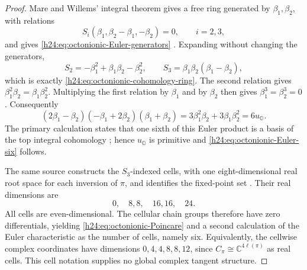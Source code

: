 \begin{proof}
Mare and Willems' integral theorem gives a free ring generated by
\(\beta_1,\beta_2\), with relations
\[
 S_i(\beta_1,\beta_2-\beta_1,-\beta_2)=0,\qquad i=2,3,
\]
and gives \eqref{h24:eq:octonionic-Euler-generators}
\cite[Theorem~1.1, p.~484, and Equation~(3.2),
p.~496]{h24:MareWillems2013}.  Expanding without changing the generators,
\[
 S_2=-\beta_1^2+\beta_1\beta_2-\beta_2^2,\qquad
 S_3=\beta_1\beta_2(\beta_1-\beta_2),
\]
which is exactly \eqref{h24:eq:octonionic-cohomology-ring}.  The second
relation gives
\(\beta_1^2\beta_2=\beta_1\beta_2^2\).  Multiplying the first relation by
\(\beta_1\) and by \(\beta_2\) then gives
\(\beta_1^3=\beta_2^3=0\).  Consequently
\[
 (2\beta_1-\beta_2)(-\beta_1+2\beta_2)(\beta_1+\beta_2)
 =3\beta_1^2\beta_2+3\beta_1\beta_2^2=6u_{\mathbb O}.
\]
The primary calculation states that one sixth of this Euler product is a
basis of the top integral cohomology
\cite[Equation~(3.3) and the following paragraph,
p.~497]{h24:MareWillems2013}; hence \(u_{\mathbb O}\) is primitive and
\eqref{h24:eq:octonionic-Euler-six} follows.

The same source constructs the \(S_3\)-indexed cells, with one
eight-dimensional real root space for each inversion of \(\pi\), and
identifies the fixed-point set
\cite[Equations~(2.11)--(2.12) and Proposition~2.10,
pp.~493--494]{h24:MareWillems2013}.  Their real dimensions are
\[
 0,\quad8,8,\quad16,16,\quad24.
\]
All cells are even-dimensional.  The cellular chain groups therefore have
zero differentials, yielding \eqref{h24:eq:octonionic-Poincare} and a second
calculation of the Euler characteristic as the number of cells, namely
six.
Equivalently, the cellwise complex coordinates have dimensions
\(0,4,4,8,8,12\), since \(C_\pi\cong\mathbb C^{4\ell(\pi)}\) as real
cells.  This cell notation supplies no global complex tangent structure.
\end{proof}


